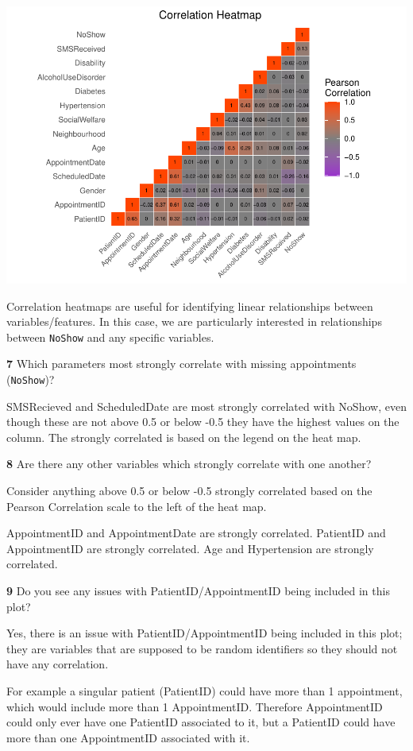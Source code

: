 \documentclass[
]{article}
\begin{document}
\includegraphics{lab1_medical_databases_files/figure-latex/unnamed-chunk-5-1.pdf}

Correlation heatmaps are useful for identifying linear relationships
between variables/features. In this case, we are particularly interested
in relationships between \texttt{NoShow} and any specific variables.

\textbf{7} Which parameters most strongly correlate with missing
appointments (\texttt{NoShow})?

SMSRecieved and ScheduledDate are most strongly correlated with NoShow,
even though these are not above 0.5 or below -0.5 they have the highest
values on the column. The strongly correlated is based on the legend on
the heat map.

\textbf{8} Are there any other variables which strongly correlate with
one another?

Consider anything above 0.5 or below -0.5 strongly correlated based on
the Pearson Correlation scale to the left of the heat map.

AppointmentID and AppointmentDate are strongly correlated. PatientID and
AppointmentID are strongly correlated. Age and Hypertension are strongly
correlated.

\textbf{9} Do you see any issues with PatientID/AppointmentID being
included in this plot?

Yes, there is an issue with PatientID/AppointmentID being included in
this plot; they are variables that are supposed to be random identifiers
so they should not have any correlation.

For example a singular patient (PatientID) could have more than 1
appointment, which would include more than 1 AppointmentID. Therefore
AppointmentID could only ever have one PatientID associated to it, but a
PatientID could have more than one AppointmentID associated with it.
\end{document}
